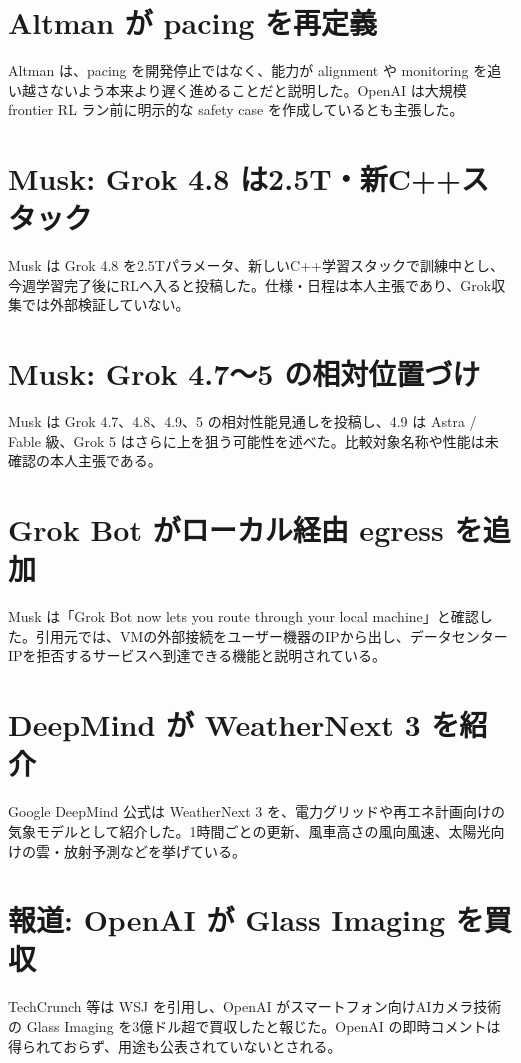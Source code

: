 \section{Altman が pacing を再定義}
Altman は、pacing を開発停止ではなく、能力が alignment や monitoring を追い越さないよう本来より遅く進めることだと説明した。OpenAI は大規模 frontier RL ラン前に明示的な safety case を作成しているとも主張した。

\section{Musk: Grok 4.8 は2.5T・新C++スタック}
Musk は Grok 4.8 を2.5Tパラメータ、新しいC++学習スタックで訓練中とし、今週学習完了後にRLへ入ると投稿した。仕様・日程は本人主張であり、Grok収集では外部検証していない。

\section{Musk: Grok 4.7〜5 の相対位置づけ}
Musk は Grok 4.7、4.8、4.9、5 の相対性能見通しを投稿し、4.9 は Astra / Fable 級、Grok 5 はさらに上を狙う可能性を述べた。比較対象名称や性能は未確認の本人主張である。

\section{Grok Bot がローカル経由 egress を追加}
Musk は「Grok Bot now lets you route through your local machine」と確認した。引用元では、VMの外部接続をユーザー機器のIPから出し、データセンターIPを拒否するサービスへ到達できる機能と説明されている。

\section{DeepMind が WeatherNext 3 を紹介}
Google DeepMind 公式は WeatherNext 3 を、電力グリッドや再エネ計画向けの気象モデルとして紹介した。1時間ごとの更新、風車高さの風向風速、太陽光向けの雲・放射予測などを挙げている。

\section{報道: OpenAI が Glass Imaging を買収}
TechCrunch 等は WSJ を引用し、OpenAI がスマートフォン向けAIカメラ技術の Glass Imaging を3億ドル超で買収したと報じた。OpenAI の即時コメントは得られておらず、用途も公表されていないとされる。

